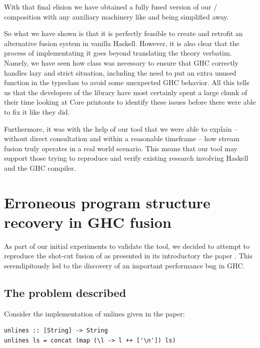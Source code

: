 With that final elision we have obtained a fully fused version of our / composition with any auxiliary machinery like  and
 being simplified away. 

So what we have shown is that it is perfectly feasible to create and retrofit an alternative fusion system in vanilla Haskell. 
However, it is also clear that the process of implementating it goes beyond translating the theory verbatim. Namely, we have seen how  class was necessary to ensure that
GHC correctly handles lazy and strict situation, including the need to put an extra unused function in the typeclass to avoid some unexpected GHC behavior.
All this tells us that the developers of the library have most certainly spent a large chunk of their time looking at Core printouts to identify these issues before
there were able to fix it like they did. 

Furthermore, it was with the help of our tool that we were able to explain -- without direct consultation and within a reasonable timeframe -- 
how stream fusion truly operates in a real world scenario. This means that our tool may support those trying to reproduce and verify existing research
involving Haskell and the GHC compiler.

\section{Erroneous program structure recovery in GHC fusion}
\label{section:results:unlines}

As part of our initial experiments to validate the tool, we decided to attempt to reproduce the shot-cut fusion of  as presented
in its introductory the paper \cite{shortcut_fusion}. This serendipitously led to the discovery of an important performance bug in GHC.

\subsection{The problem described}
Consider the implementation of unlines given in the paper:

\begin{listing}[H]
\begin{verbatim}
unlines :: [String] -> String
unlines ls = concat (map (\l -> l ++ ['\n']) ls)
\end{verbatim}
\end{listing}

